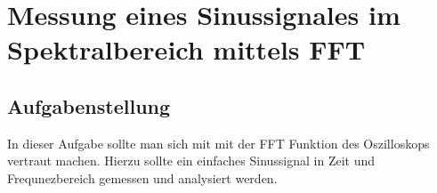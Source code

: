 \section{Messung eines Sinussignales im Spektralbereich mittels FFT}
\subsection{Aufgabenstellung}
In dieser Aufgabe sollte man sich mit mit der FFT Funktion des Oszilloskops vertraut machen. Hierzu sollte ein einfaches Sinussignal in Zeit und Frequnezbereich gemessen und analysiert werden.
